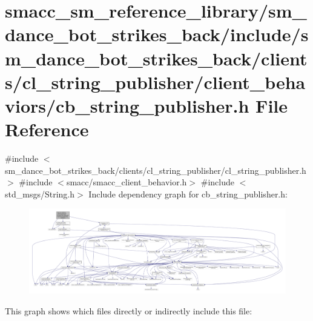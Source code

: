 \hypertarget{strikes__back_2include_2sm__dance__bot__strikes__back_2clients_2cl__string__publisher_2client__b6092546a14189497fb33fc7e70b5eb23}{}\section{smacc\+\_\+sm\+\_\+reference\+\_\+library/sm\+\_\+dance\+\_\+bot\+\_\+strikes\+\_\+back/include/sm\+\_\+dance\+\_\+bot\+\_\+strikes\+\_\+back/clients/cl\+\_\+string\+\_\+publisher/client\+\_\+behaviors/cb\+\_\+string\+\_\+publisher.h File Reference}
\label{strikes__back_2include_2sm__dance__bot__strikes__back_2clients_2cl__string__publisher_2client__b6092546a14189497fb33fc7e70b5eb23}
{\ttfamily \#include $<$sm\+\_\+dance\+\_\+bot\+\_\+strikes\+\_\+back/clients/cl\+\_\+string\+\_\+publisher/cl\+\_\+string\+\_\+publisher.\+h$>$}\newline
{\ttfamily \#include $<$smacc/smacc\+\_\+client\+\_\+behavior.\+h$>$}\newline
{\ttfamily \#include $<$std\+\_\+msgs/\+String.\+h$>$}\newline
Include dependency graph for cb\+\_\+string\+\_\+publisher.\+h\+:
\nopagebreak
\begin{figure}[H]
\begin{center}
\leavevmode
\includegraphics[width=350pt]{strikes__back_2include_2sm__dance__bot__strikes__back_2clients_2cl__string__publisher_2client__bf8ef1cec184071902e116df5c9c999a1}
\end{center}
\end{figure}
This graph shows which files directly or indirectly include this file\+:
\nopagebreak

